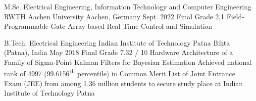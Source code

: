 
\begin{cveducation}

\cvschool
	{M.Sc.} %
	{Electrical Engineering, Information Technology and Computer Engineering} %
	{RWTH Aachen University} %
	{Aachen, Germany} %
	{Sept. 2022} %
	{Final Grade 2,1} %
	{Field-Programmable Gate Array based Real-Time Control and Simulation} %
	{} %

\cvschool
	{B.Tech.} %
	{Electrical Engineering} %
	{Indian Institute of Technology Patna} %
	{Bihta (Patna), India} %
	{May 2018} %
	{Final Grade 7.32 / 10} %
	{Hardware Architecture of a Family of Sigma-Point Kalman Filters for Bayesian Estimation} %
	{Achieved national rank of 4997 (99.6156\textsuperscript{th} percentile) in Common Merit List of Joint Entrance Exam (JEE) from among 1.36 million students to secure study place at Indian Institute of Technology Patna} %



\end{cveducation}
